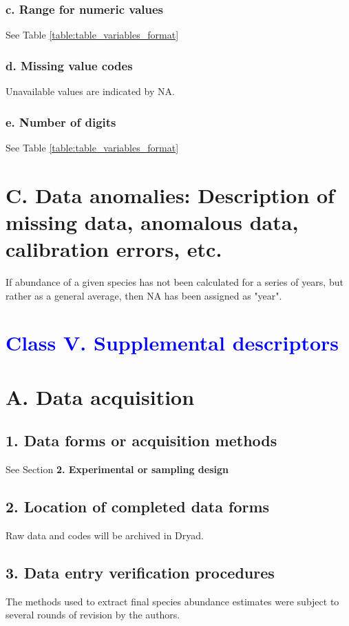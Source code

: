 \documentclass[a4paper,twoside,12pt]{article}
\begin{document}
                    \subsubsection*{c. Range for numeric values} See Table \ref{table:table_variables_format}
                    \subsubsection*{d. Missing value codes} Unavailable values are indicated by NA.
                    \subsubsection*{e. Number of digits} See Table \ref{table:table_variables_format}
            \newpage
            
           
			\newpage
        
 \section*{C. Data anomalies: Description of missing data, anomalous data, calibration errors, etc.}
  If abundance of a given species has not been calculated for a series of years, but rather as a general average, then NA has been assigned as "year".
 
 \section*{\textcolor{Blue}{Class V. Supplemental descriptors}}
    \section*{A. Data acquisition}
    		\subsection*{1. Data forms or acquisition methods}
   		See Section \textbf{2. Experimental or sampling design} 
   		\subsection*{2. Location of completed data forms}
        Raw data and codes will be archived in Dryad.
        \subsection*{3. Data entry verification procedures}
       	The methods used to extract final species abundance estimates were subject to several rounds of revision by the authors.
       	
\end{document}
